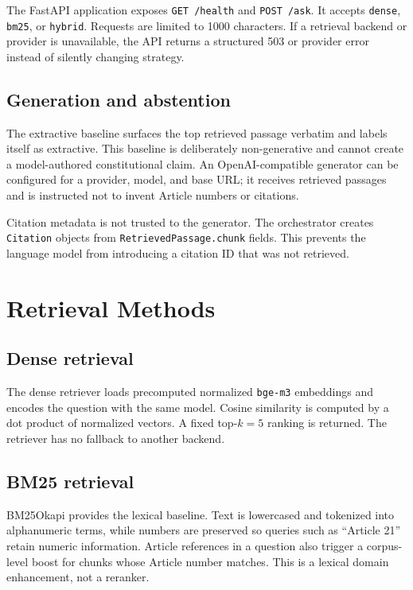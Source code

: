 \documentclass[11pt]{article}
\begin{document}
The FastAPI application exposes \texttt{GET /health} and \texttt{POST /ask}. It accepts \texttt{dense}, \texttt{bm25}, or \texttt{hybrid}. Requests are limited to 1000 characters. If a retrieval backend or provider is unavailable, the API returns a structured 503 or provider error instead of silently changing strategy.

\subsection{Generation and abstention}

The extractive baseline surfaces the top retrieved passage verbatim and labels itself as extractive. This baseline is deliberately non-generative and cannot create a model-authored constitutional claim. An OpenAI-compatible generator can be configured for a provider, model, and base URL; it receives retrieved passages and is instructed not to invent Article numbers or citations.

Citation metadata is not trusted to the generator. The orchestrator creates \texttt{Citation} objects from \texttt{RetrievedPassage.chunk} fields. This prevents the language model from introducing a citation ID that was not retrieved.

\section{Retrieval Methods}

\subsection{Dense retrieval}

The dense retriever loads precomputed normalized \texttt{bge-m3} embeddings and encodes the question with the same model. Cosine similarity is computed by a dot product of normalized vectors. A fixed top-$k=5$ ranking is returned. The retriever has no fallback to another backend.

\subsection{BM25 retrieval}

BM25Okapi provides the lexical baseline. Text is lowercased and tokenized into alphanumeric terms, while numbers are preserved so queries such as ``Article 21'' retain numeric information. Article references in a question also trigger a corpus-level boost for chunks whose Article number matches. This is a lexical domain enhancement, not a reranker.
\end{document}
